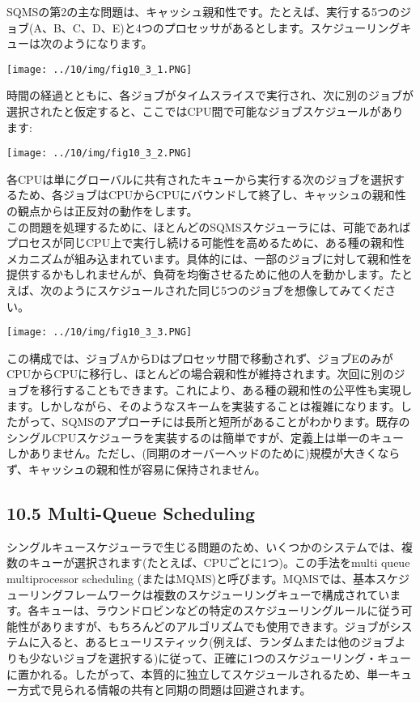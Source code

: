 SQMSの第2の主な問題は、キャッシュ親和性です。たとえば、実行する5つのジョブ(A、B、C、D、E)と4つのプロセッサがあるとします。スケジューリングキューは次のようになります。

\texttt{[image: ../10/img/fig10\_3\_1.PNG]}

時間の経過とともに、各ジョブがタイムスライスで実行され、次に別のジョブが選択されたと仮定すると、ここではCPU間で可能なジョブスケジュールがあります:

\texttt{[image: ../10/img/fig10\_3\_2.PNG]}

各CPUは単にグローバルに共有されたキューから実行する次のジョブを選択するため、各ジョブはCPUからCPUにバウンドして終了し、キャッシュの親和性の観点からは正反対の動作をします。\\
この問題を処理するために、ほとんどのSQMSスケジューラには、可能であればプロセスが同じCPU上で実行し続ける可能性を高めるために、ある種の親和性メカニズムが組み込まれています。具体的には、一部のジョブに対して親和性を提供するかもしれませんが、負荷を均衡させるために他の人を動かします。たとえば、次のようにスケジュールされた同じ5つのジョブを想像してみてください。

\texttt{[image: ../10/img/fig10\_3\_3.PNG]}

この構成では、ジョブAからDはプロセッサ間で移動されず、ジョブEのみがCPUからCPUに移行し、ほとんどの場合親和性が維持されます。次回に別のジョブを移行することもできます。これにより、ある種の親和性の公平性も実現します。しかしながら、そのようなスキームを実装することは複雑になります。したがって、SQMSのアプローチには長所と短所があることがわかります。既存のシングルCPUスケジューラを実装するのは簡単ですが、定義上は単一のキューしかありません。ただし、(同期のオーバーヘッドのために)規模が大きくならず、キャッシュの親和性が容易に保持されません。

\hypertarget{multi-queue-scheduling}{%
\subsection*{10.5 Multi-Queue Scheduling}\label{multi-queue-scheduling}}

シングルキュースケジューラで生じる問題のため、いくつかのシステムでは、複数のキューが選択されます(たとえば、CPUごとに1つ)。この手法をmulti
queue multiprocessor scheduling
(またはMQMS)と呼びます。MQMSでは、基本スケジューリングフレームワークは複数のスケジューリングキューで構成されています。各キューは、ラウンドロビンなどの特定のスケジューリングルールに従う可能性がありますが、もちろんどのアルゴリズムでも使用できます。ジョブがシステムに入ると、あるヒューリスティック(例えば、ランダムまたは他のジョブよりも少ないジョブを選択する)に従って、正確に1つのスケジューリング・キューに置かれる。したがって、本質的に独立してスケジュールされるため、単一キュー方式で見られる情報の共有と同期の問題は回避されます。

